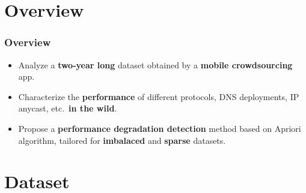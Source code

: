\section{Overview}

\begin{frame}
    \frametitle{Overview}

    \begin{itemize}
        \setlength{\itemsep}{1.4em}
        \item Analyze a \textbf{two-year long} dataset obtained by a \textbf{mobile crowdsourcing} app.

        \item Characterize the \textbf{performance} of different protocols, DNS deployments, IP anycast, etc.\ \textbf{in the wild}.

        \item Propose a \textbf{performance degradation detection} method based on Apriori algorithm, tailored for \textbf{imbalaced} and \textbf{sparse} datasets.
    \end{itemize}

\end{frame}

\section{Dataset}

